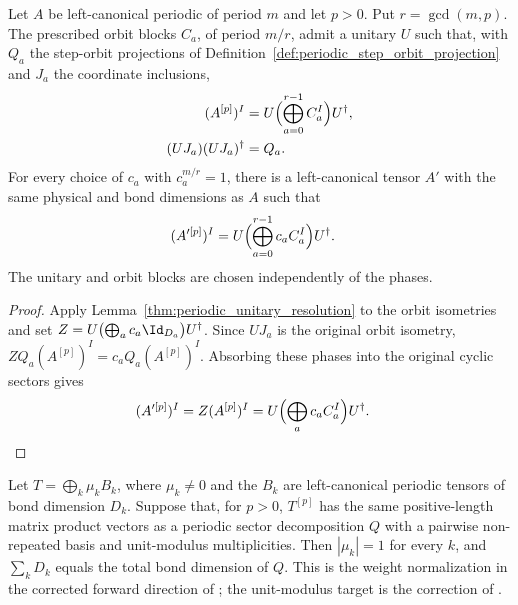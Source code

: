 \begin{lemma}
    \label{thm:periodic_unitary_orbit_root}
    \leanok
    Let $A$ be left-canonical periodic of period $m$ and let $p>0$.
    Put $r=\gcd(m,p)$. The prescribed orbit blocks $C_a$, of period $m/r$,
    admit a unitary $U$ such that, with $Q_a$ the step-orbit projections of
    Definition~\ref{def:periodic_step_orbit_projection} and $J_a$ the
    coordinate inclusions,
    \begin{align}
        (A^{[p]})^I          & =U\Bigl(\bigoplus_{a=0}^{r-1}C_a^I\Bigr)U^\dagger, \notag \\
        (UJ_a)(UJ_a)^\dagger & =Q_a. \notag
    \end{align}
    For every choice of $c_a$ with $c_a^{m/r}=1$, there is a left-canonical
    tensor $A'$ with the same physical and bond dimensions as $A$ such that
    \begin{align}
        (A'^{[p]})^I & =U\Bigl(\bigoplus_{a=0}^{r-1}c_aC_a^I\Bigr)U^\dagger. \notag
    \end{align}
    The unitary and orbit blocks are chosen independently of the phases.
\end{lemma}

\begin{proof}
    \leanok
    Apply Lemma~\ref{thm:periodic_unitary_resolution} to the orbit
    isometries and set $Z=U\bigl(\bigoplus_ac_a\Id_{D_a}\bigr)U^\dagger$.
    Since $UJ_a$ is the original orbit isometry,
    $ZQ_a(A^{[p]})^I=c_aQ_a(A^{[p]})^I$. Absorbing these phases into the
    original cyclic sectors gives
    \begin{align}
        (A'^{[p]})^I & =Z(A^{[p]})^I=U\Bigl(\bigoplus_ac_aC_a^I\Bigr)U^\dagger. \notag
    \end{align}
\end{proof}

\begin{lemma}
    \label{thm:periodic_blocked_weight_normalization}
    \leanok
    Let $T=\bigoplus_k\mu_k B_k$, where $\mu_k\ne0$ and the $B_k$ are
    left-canonical periodic tensors of bond dimension $D_k$. Suppose that, for $p>0$, $T^{[p]}$ has the same
    positive-length matrix product vectors as a periodic sector decomposition
    $Q$ with a pairwise non-repeated basis and unit-modulus multiplicities.
    Then $|\mu_k|=1$ for every $k$, and $\sum_k D_k$ equals the total bond
    dimension of $Q$.
    This is the weight normalization in the corrected forward direction of
    \cite[Theorem~4.1, lines~750--756]{DeLasCuevas2017Irreducible}; the
    unit-modulus target is the correction of
    \cite{gap:dccsp17_thm41_forward_trace_preservation}.
\end{lemma}

